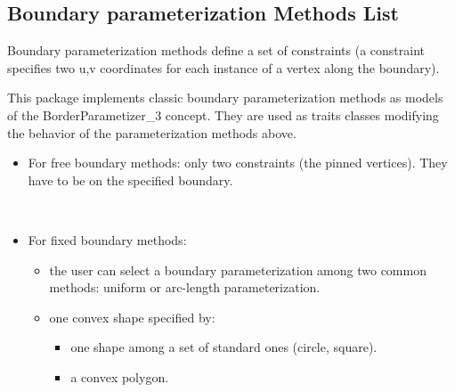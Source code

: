 \subsection{Boundary parameterization Methods List}

Boundary parameterization methods define a
set of constraints (a constraint specifies two u,v coordinates for
each instance of a vertex along the boundary).

This package implements classic boundary parameterization methods
as models of the BorderParametizer\_3 concept. They are used as traits classes
modifying the behavior of the parameterization methods above.

\begin{itemize}

\item For free boundary methods: only two constraints (the pinned
vertices). They have to be on the specified boundary.

  \\

\item For fixed boundary methods:

    \begin{itemize}

    \item the user can select a boundary
        parameterization among two common methods: uniform or
        arc-length parameterization.

    \item one convex shape specified by:

        \begin{itemize}

        \item one shape among a set of standard ones (circle, square).

        \item a convex polygon.

        \end{itemize}

    \end{itemize}

      \\
      \\
      \\
      \\

\end{itemize}


